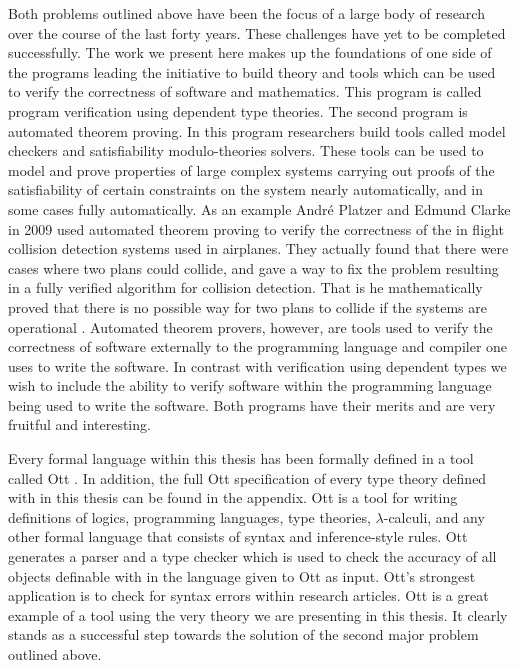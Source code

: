 \documentclass[phd,appendix,dedicationpage,ackpage,epigraphpage]{uithesis}
\begin{document}
Both problems outlined above have been the focus of a large body of
research over the course of the last forty years.  These challenges
have yet to be completed successfully.  The work we present here makes
up the foundations of one side of the programs leading the initiative
to build theory and tools which can be used to verify the correctness
of software and mathematics.  This program is called program
verification using dependent type theories.  The second program is
automated theorem proving.  In this program researchers build tools
called model checkers and satisfiability modulo-theories solvers.
These tools can be used to model and prove properties of large complex
systems carrying out proofs of the satisfiability of certain
constraints on the system nearly automatically, and in some cases
fully automatically.  As an example Andr\'{e} Platzer and Edmund
Clarke in 2009 used automated theorem proving to verify the
correctness of the in flight collision detection systems used in
airplanes.  They actually found that there were cases where two plans
could collide, and gave a way to fix the problem resulting in a fully
verified algorithm for collision detection.  That is he mathematically
proved that there is no possible way for two plans to collide if the
systems are operational \cite{DBLP:conf/fm/PlatzerC09}.  Automated
theorem provers, however, are tools used to verify the correctness of
software externally to the programming language and compiler one uses
to write the software.  In contrast with verification using dependent
types we wish to include the ability to verify software within the
programming language being used to write the software. Both programs
have their merits and are very fruitful and interesting.

Every formal language within this thesis has been formally defined in
a tool called Ott \cite{Sewell:2010}.  In addition, the full Ott
specification of every type theory defined with in this thesis can be
found in the appendix.  Ott is a tool for writing definitions of
logics, programming languages, type theories, $\lambda$-calculi, and
any other formal language that consists of syntax and inference-style
rules.  Ott generates a parser and a type checker which is used to
check the accuracy of all objects definable with in the language given
to Ott as input.  Ott's strongest application is to check for syntax
errors within research articles.  Ott is a great example of a tool
using the very theory we are presenting in this thesis.  It clearly
stands as a successful step towards the solution of the second major
problem outlined above.
\end{document}
